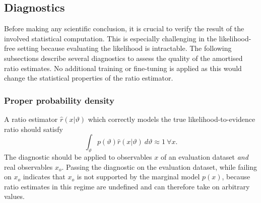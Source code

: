 \documentclass[fleqn,usenatbib]{mnras}
\begin{document}
\subsection{Diagnostics}
\label{sec:diagnostics}
Before making any scientific conclusion, it
is crucial to verify the result of the involved statistical computation.
This is especially challenging in the likelihood-free setting because
evaluating the likelihood is intractable.
The following subsections describe several diagnostics to
assess the quality of the amortised ratio estimates.
No additional training or fine-tuning is applied as this would
change the statistical properties of the ratio estimator.

\subsubsection{Proper probability density}
\label{sec:diagnostic_proper_density}
A ratio estimator $\hat{r}(x\vert\vartheta)$ which correctly
models the true likelihood-to-evidence ratio should satisfy
\begin{equation}
  \label{eq:diagnostic_proper_density}
  \int_\vartheta p(\vartheta)\hat{r}(x\vert\vartheta)~d\vartheta \approx 1~\forall x.
\end{equation}
The diagnostic should be applied to observables $x$
of an evaluation dataset \emph{and} real observables $x_o$. Passing
the diagnostic on the evaluation dataset, while failing
on $x_o$ indicates that $x_o$ is not
supported by the marginal model $p(x)$, because ratio
estimates in this regime are undefined and
can therefore take on arbitrary values.
\end{document}
